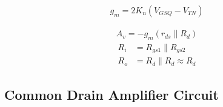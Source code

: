 \begin{equation*}
  \begin{aligned}
    g_m = 2 K_n \left( V_{GSQ} - V_{TN} \right)
  \end{aligned}
\end{equation*}

\begin{equation*}
  \begin{aligned}
    A_v = - g_m \left( r_{ds} \parallel R_d \right)
  \end{aligned}
\end{equation*}
\begin{equation*}
  \begin{aligned}
    R_i &= R_{gs1} \parallel R_{gs2} \\
    R_o &= R_d \parallel R_d \approx R_d
  \end{aligned}
\end{equation*}

\subsection{Common Drain Amplifier Circuit}

